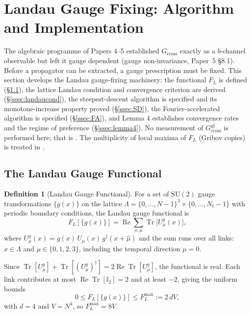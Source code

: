 \documentclass[11pt,a4paper]{article}
\theoremstyle{plain}
\theoremstyle{definition}
\newtheorem{definition}{Definition}
\theoremstyle{remark}
\newcommand{\SU}{\mathrm{SU}}
\newcommand{\Tr}{\operatorname{Tr}}
\renewcommand{\Re}{\operatorname{Re}}
\newcommand{\Gcross}{G_{\mathrm{cross}}}
\newcommand{\Gcrossgf}{G_{\mathrm{cross}}^{\mathrm{gf}}}
\newcommand{\FL}{F_{L}}
\newcommand{\Nt}{N_{t}}
\newcommand{\Id}{\mathbb{I}}
\begin{document}
\section{Landau Gauge Fixing: Algorithm and Implementation}
\label{sec:gaugefix}

The algebraic programme of Papers 4--5 established $\Gcross$ exactly as
a $b$-channel observable but left it gauge dependent (gauge non-invariance,
Paper~5 \S8.1). Before a propagator can be extracted, a gauge prescription
must be fixed. This section develops the Landau gauge-fixing machinery:
the functional $\FL$ is defined (\S\ref{ssec:functional}), the lattice
Landau condition and convergence criterion are derived
(\S\ref{ssec:landaucond}), the steepest-descent algorithm is specified
and its monotone-increase property proved (\S\ref{ssec:SD}), the
Fourier-accelerated algorithm is specified (\S\ref{ssec:FA}), and
Lemma 4 establishes convergence rates and the regime of preference
(\S\ref{ssec:lemma4}). No measurement of $\Gcrossgf$ is performed here;
that is . The multiplicity of local maxima of $\FL$
(Gribov copies) is treated in .

\subsection{The Landau Gauge Functional}
\label{ssec:functional}

\begin{definition}[Landau Gauge Functional]
For a set of $\SU(2)$ gauge transformations $\{g(x)\}$ on the lattice
$\Lambda=\{0,\ldots,N-1\}^3\times\{0,\ldots,\Nt-1\}$ with periodic
boundary conditions, the Landau gauge functional is
\begin{equation}
  \FL[\{g(x)\}]=\Re\sum_{x,\mu}\Tr\bigl[U^{g}_{\mu}(x)\bigr],
  \label{eq:FLdef}
\end{equation}
where $U^{g}_{\mu}(x)=g(x)\,U_{\mu}(x)\,g^{\dagger}(x+\hat\mu)$ and the
sum runs over all links: $x\in\Lambda$ and $\mu\in\{0,1,2,3\}$,
including the temporal direction $\mu=0$.
\end{definition}

Since $\Tr[U^g_\mu]+\Tr[(U^g_\mu)^\dagger]=2\Re\Tr[U^g_\mu]$, the
functional is real. Each link contributes at most $\Re\Tr[\Id_2]=2$ and
at least $-2$, giving the uniform bounds
\begin{equation}
  0\le \FL[\{g(x)\}]\le \FL^{\max}:=2\,dV,
  \label{eq:FLbounds}
\end{equation}
with $d=4$ and $V=N^4$, so $\FL^{\max}=8V$.
\end{document}
